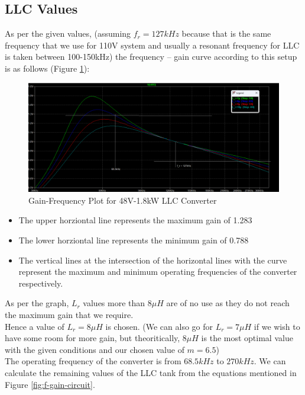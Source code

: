 \subsection{LLC Values}
As per the given values, (assuming $f_r = 127kHz$ because that is the same frequency that we use for 110V system and usually a resonant frequency for LLC is taken between 100-150kHz) the frequency – gain curve according to this setup is as follows (Figure \ref{fig:image4}):
\begin{figure}[H]
    \centering
    \includegraphics[width=\textwidth]{images/image4.png}
    \caption{Gain-Frequency Plot for 48V-1.8kW LLC Converter}
    \label{fig:image4}
\end{figure}
\begin{itemize}
    \item The upper horziontal line represents the maximum gain of 1.283
    \item The lower horziontal line represents the minimum gain of 0.788
    \item The vertical lines at the intersection of the horizontal lines with the curve represent the maximum and minimum operating frequencies of the converter respectively.
\end{itemize}
As per the graph, $L_r$ values more than $8\mu H$ are of no use as they do not reach the maximum gain that we require.\\
Hence a value of $L_r = 8\mu H$ is chosen. (We can also go for $L_r = 7\mu H$ if we wish to have some room for more gain, but theoritically, $8\mu H$ is the most optimal value with the given conditions and our chosen value of $m = 6.5$)\\
The operating frequency of the converter is from $68.5kHz$ to $270kHz$.
We can calculate the remaining values of the LLC tank from the equations mentioned in Figure \ref{fig:f-gain-circuit}.